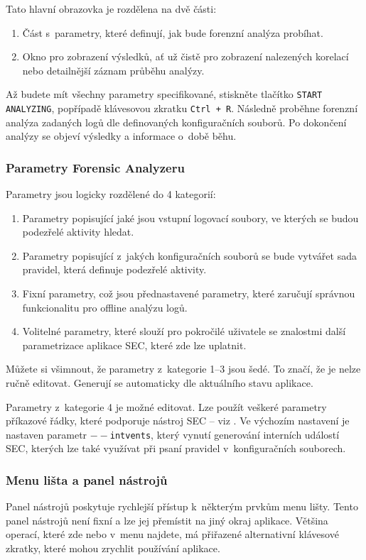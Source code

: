 \documentclass[a4paper,12pt]{article}
\begin{document}
Tato hlavní obrazovka je rozdělena na dvě části:
\begin{enumerate}
	\item Část s~parametry, které definují, jak bude forenzní analýza probíhat.
	\item Okno pro zobrazení výsledků, ať už čistě pro zobrazení nalezených korelací nebo detailnější záznam průběhu analýzy.
\end{enumerate}

Až budete mít všechny parametry specifikované, stiskněte tlačítko \texttt{START ANALYZING}, popřípadě klávesovou zkratku \texttt{Ctrl + R}. Následně proběhne forenzní analýza zadaných logů dle definovaných konfiguračních souborů. Po dokončení analýzy se objeví výsledky a informace o~době běhu.

\subsubsection{Parametry Forensic Analyzeru}
Parametry jsou logicky rozdělené do 4 kategorií:
\begin{enumerate}
	\item Parametry popisující jaké jsou vstupní logovací soubory, ve kterých se budou podezřelé aktivity hledat.
	\item Parametry popisující z~jakých konfiguračních souborů se bude vytvářet sada pravidel, která definuje podezřelé aktivity.
	\item Fixní parametry, což jsou přednastavené parametry, které zaručují správnou funkcionalitu pro offline analýzu logů.
	\item Volitelné parametry, které slouží pro pokročilé uživatele se znalostmi další parametrizace aplikace SEC, které zde lze uplatnit. 
\end{enumerate}

Můžete si všimnout, že parametry z~kategorie 1--3 jsou šedé. To značí, že je nelze ručně editovat. Generují se automaticky dle aktuálního stavu aplikace.

Parametry z~kategorie 4 je možné editovat. Lze použít veškeré parametry příkazové řádky, které podporuje nástroj SEC -- viz \cite{secProgram, secManPage}. Ve výchozím nastavení je nastaven parametr \texttt{$--$intvents}, který vynutí generování interních událostí SEC, kterých lze také využívat při psaní pravidel v~konfiguračních souborech.

\subsubsection{Menu lišta a panel nástrojů}
Panel nástrojů poskytuje rychlejší přístup k~některým prvkům menu lišty. Tento panel nástrojů není fixní a lze jej přemístit na jiný okraj aplikace. Většina operací, které zde nebo v~menu najdete, má přiřazené alternativní klávesové zkratky, které mohou zrychlit používání aplikace.
\end{document}
